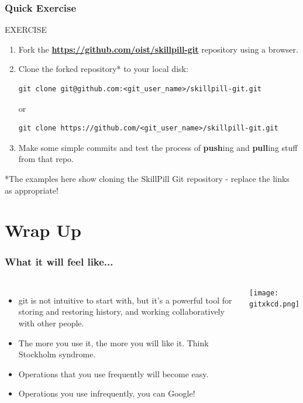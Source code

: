 \documentclass{beamer}
\begin{document}
\begin{frame}[fragile]
\frametitle{Quick Exercise}
    \begin{block}{EXERCISE}
        \begin{enumerate}
        \item Fork the \textbf{\href{https://github.com/oist/skillpill-git}{https://github.com/oist/skillpill-git}} repository using a browser.
        \item Clone the forked repository* to your local disk:
        \begin{lstlisting}
git clone git@github.com:<git_user_name>/skillpill-git.git
        \end{lstlisting}
        or
        \begin{lstlisting}
git clone https://github.com/<git_user_name>/skillpill-git.git
        \end{lstlisting}
        \item Make some simple commits and test the process of \textbf{push}ing and \textbf{pull}ing stuff from that repo.
        \end{enumerate}
    \end{block}

*The examples here show cloning the SkillPill Git repository - replace the links as appropriate!
\end{frame}

\section{Wrap Up}

\begin{frame}
\frametitle{What it will feel like...}
\begin{columns}
\begin{itemize}
\item git is not intuitive to start with, but it's %
a powerful tool for storing and restoring history, and working collaboratively with other people.
\item The more you use it, the more you will like it. Think Stockholm syndrome.
\item Operations that you use frequently will become easy.
\item Operations you use infrequently, you can Google!
\end{itemize}
\texttt{[image: gitxkcd.png]}
\end{columns}
\end{frame}
\end{document}
